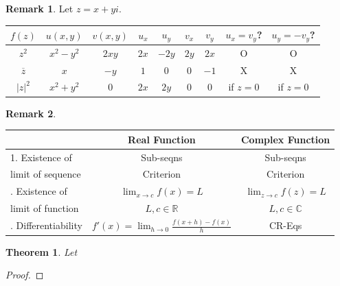 \documentclass[12pt,openany]{book}
\newtheorem{theorem}{Theorem}[chapter]
\theoremstyle{definition}
\newtheorem{remark}{Remark}[section]
\newcommand{\abs}[1]{\left\lvert #1 \right\rvert}
\newcommand{\conjugate}[1]{\overline{#1}}
\begin{document}
	\begin{remark}
		Let $z=x+yi$. \begin{table}[h!]
			\centering
			\begin{tabular}{@{}c||cc|cc|cc||cc@{}}
				\toprule
				$f(z)$ & $u(x,y)$ & $v(x,y)$ & $u_x$ & $u_y$ & $v_x$ & $v_y$ & $u_x=v_y$? &$u_y=-v_y$?\\
				\midrule
				$z^2$ & $x^2-y^2$ & $2xy$ & $2x$ & $-2y$ & $2y$ & $2x$ & O & O\\
				\addlinespace
				$\conjugate{z}$ & $x$ & $-y$ & $1$ & $0$ & $0$ & $-1$ & X & X\\
				\addlinespace
				$\abs{z}^2$ & $x^2+y^2$ & $0$ & $2x$ & $2y$ & $0$ & $0$ & if $z=0$ & if $z=0$\\
				\bottomrule
			\end{tabular}
		\end{table}
		
	\end{remark}
	
	\begin{remark}
		\ \begin{table}[h!]
			\centering
			\begin{tabular}{@{}l||c|c@{}}
				\toprule
				& \textbf{Real Function} & \textbf{Complex Function} \\
				\midrule
				1. Existence of & Sub-seqns & Sub-seqns\\
				limit of sequence & Criterion & Criterion \\
				\addlinespace
				2. Existence of & $\lim_{x\to c} f(x) = L$ & $\lim_{z\to c} f(z) = L$ \\
				limit of function & $L, c \in \mathbb{R}$ & $L, c \in \mathbb{C}$ \\
				\addlinespace
				3. Differentiability & $f'(x) = \lim_{h\to 0} \frac{f(x+h) - f(x)}{h}$ & CR-Eqs \\
				\bottomrule
			\end{tabular}
		\end{table}
	\end{remark}
	
	
	\begin{tcolorbox}[colframe=thmcolor, title={\color{white}\bf 
		}]
		\begin{theorem}
			Let
		\end{theorem}
	\end{tcolorbox}
	\begin{proof}
		
	\end{proof}
	
\end{document}
